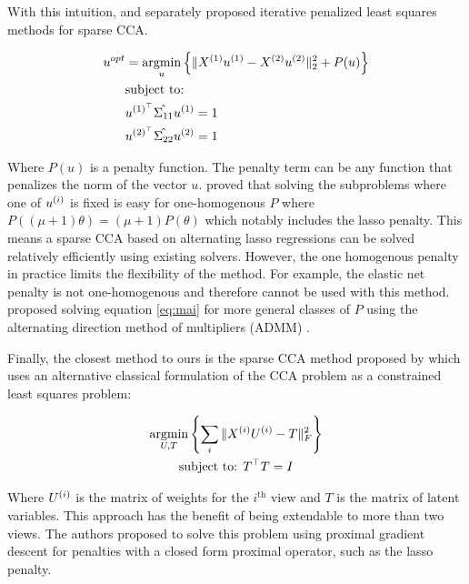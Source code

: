 With this intuition, \cite{wilms2015sparse} and \cite{mai2019iterative} separately proposed iterative penalized least
squares methods for sparse CCA.

\begin{align}
    \label{eq:mai}
    u^{opt} &= \underset{u}{\mathrm{argmin}} \left\{ \|X^{(1)}u^{(1)} - X^{(2)}u^{(2)}\|_2^2 + P(u) \right\} \\
    &\text{subject to:} \notag \\
    &u^{(1)^{\top}} \hat{\Sigma_{11}} u^{(1)}=1 \notag \\
    &u^{(2)^{\top}} \hat{\Sigma_{22}} u^{(2)}=1 \notag
\end{align}

Where \(P(u)\) is a penalty function.
The penalty term can be any function that penalizes the norm of the vector \(u\).
\cite{mai2019iterative} proved that solving the subproblems where one of $u^{(i)}$ is fixed is easy for one-homogenous $P$ where
\( P((\mu + 1)\theta) = (\mu + 1)P(\theta) \) which notably includes the lasso penalty.
This means a sparse CCA based
on alternating lasso regressions can be solved relatively efficiently using existing solvers.
However, the one homogenous penalty in practice limits the flexibility of the method.
For example, the elastic net penalty is not one-homogenous and therefore cannot be used with this method.\cite{
    kanatsoulis2018structured} proposed solving equation \ref{eq:mai} for more general classes of $P$ using the
alternating direction method of multipliers (ADMM) \cite{boyd2011distributed}.

Finally, the closest method to ours is the sparse CCA method proposed by \cite{fu2017scalable} which uses an
alternative classical formulation of the CCA problem as a constrained least squares problem\cite{
    carroll1968generalization,
    kettenring1971canonical}:

\begin{gather*}
    \underset{U, T}{\mathrm{argmin}}\left\{\sum_i \|X^{(i)} U^{(i)} - T\|_F^2 \right\}\\
    \text{subject to: }T^\top T = I\\
\end{gather*}

Where \(U^{(i)}\) is the matrix of weights for the $i^{\text{th}}$ view and \(T\) is the matrix of latent variables. This
approach has the benefit of being extendable to more than two views. The authors proposed to solve this problem using
proximal gradient descent for penalties with a closed form proximal operator, such as the lasso penalty.

